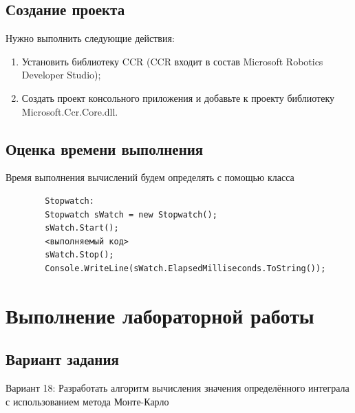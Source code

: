 \documentclass[russian,utf8,pointsection]{eskdtext}
\begin{document}
       \subsection{Создание проекта}
       Нужно выполнить следующие действия:
       \begin{enumerate}
       \item Установить библиотеку CCR (CCR входит в состав Microsoft Robotics Developer Studio);
       \item Создать проект консольного приложения и добавьте к проекту библиотеку Microsoft.Ccr.Core.dll.
       	\end{enumerate}
       	
       	\subsection{Оценка времени выполнения}
       	Время выполнения вычислений будем определять с помощью класса
       	\begin{lstlisting}
       	Stopwatch:       	
       	Stopwatch sWatch = new Stopwatch();       	
       	sWatch.Start();       	
       	<выполняемый код>       	
       	sWatch.Stop();       	
       	Console.WriteLine(sWatch.ElapsedMilliseconds.ToString());
       	      	\end{lstlisting}
       	
       	\section{Выполнение лабораторной работы}
       		\subsection{Вариант задания}
       		Вариант 18:
	       	Разработать алгоритм вычисления значения определённого интеграла с использованием метода Монте-Карло
\end{document}
